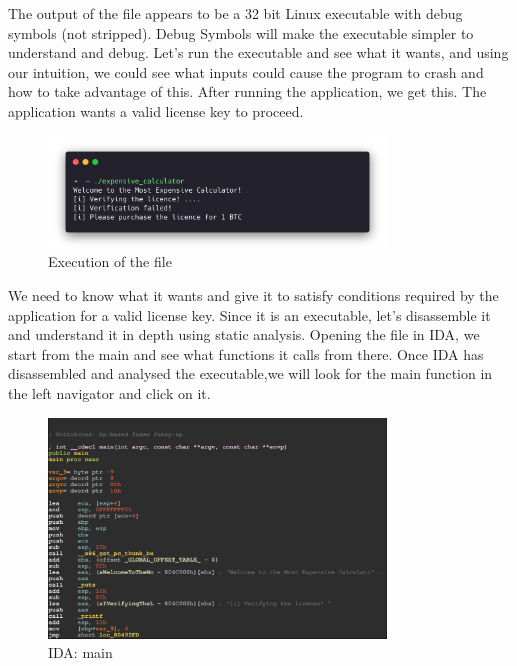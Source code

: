 The output of the file appears to be a 32 bit Linux executable with debug
symbols (not stripped). Debug Symbols will make the executable simpler to
understand and debug. Let's run the executable and see what it wants, and using
our intuition, we could see what inputs could cause the program to crash and how
to take advantage of this. After running the application, we get this. The
application wants a valid license key to proceed.
\begin{figure}[H]
  \centering
  \includegraphics[width=0.8\textwidth]{figures/run_file}
  \caption{Execution of the file}
  \label{f:run_file}
\end{figure}
We need to know what it wants and give it to satisfy conditions required by the
application for a valid license key. Since it is an executable, let's
disassemble it and understand it in depth using static analysis. Opening the
file in IDA, we start from the main and see what functions it calls from
there. Once IDA has disassembled and analysed the executable,we will look for
the main function in the left navigator and click on it.

\begin{figure}[H]
  \centering
  \includegraphics[width=0.8\textwidth]{figures/ida-main}
  \caption{IDA: main}
  \label{f:ida-main}
\end{figure}

